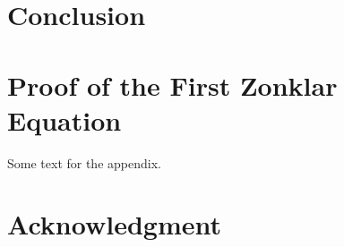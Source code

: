\documentclass[journal]{IEEEtran}
\begin{document}



\section{Conclusion}
\blindtext






%


\appendices
\section{Proof of the First Zonklar Equation}
Some text for the appendix.

\section*{Acknowledgment}
\end{document}
